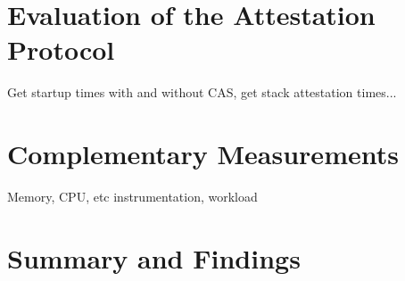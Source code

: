\section{Evaluation of the Attestation Protocol}
\label{sec:evaluation_attestation_protocol}

Get startup times with and without CAS, get stack attestation times...

\section{Complementary Measurements}
\label{sec:complementary_measurements}

Memory, CPU, etc instrumentation, workload

\section{ Summary and Findings}
\label{sec:summary_and_findings}







